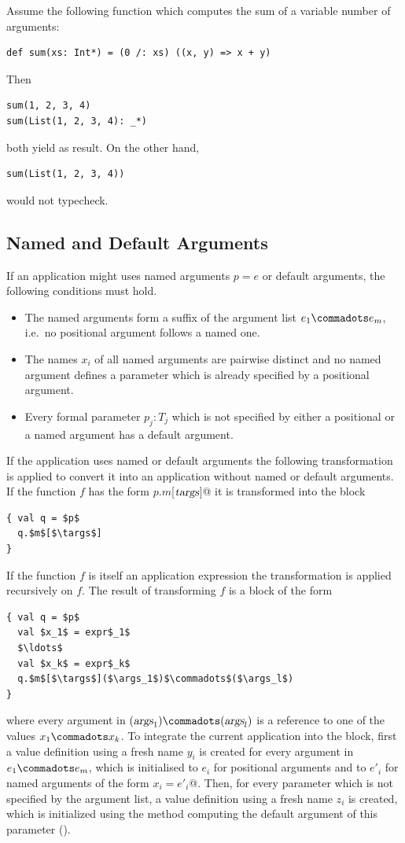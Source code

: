\example Assume the following function which computes the sum of a
variable number of arguments:
\begin{lstlisting}
def sum(xs: Int*) = (0 /: xs) ((x, y) => x + y)
\end{lstlisting}
Then
\begin{lstlisting}
sum(1, 2, 3, 4)
sum(List(1, 2, 3, 4): _*)
\end{lstlisting}
both yield  as result. On the other hand, 
\begin{lstlisting}
sum(List(1, 2, 3, 4))
\end{lstlisting}
would not typecheck.

\subsection{Named and Default Arguments}
\label{sec:named-default}

If an application might uses named arguments $p = e$ or default
arguments, the following conditions must hold.
\begin{itemize}
\item The named arguments form a suffix of the argument list $e_1 \commadots e_m$,
  i.e.\ no positional argument follows a named one.
\item The names $x_i$ of all named arguments are pairwise distinct and no named
  argument defines a parameter which is already specified by a
  positional argument.
\item Every formal parameter $p_j:T_j$ which is not specified by either a positional
  or a named argument has a default argument.
\end{itemize}

If the application uses named or default
arguments the following transformation is applied to convert it into
an application without named or default arguments. If the function $f$
has the form \lstinline@$p.m$[$\mbox{\sl targs}$]@ it is transformed into the
block
\begin{lstlisting}
{ val q = $p$
  q.$m$[$\targs$]
}
\end{lstlisting}
If the function $f$ is itself an application expression the transformation
is applied recursively on $f$. The result of transforming $f$ is a block of
the form
\begin{lstlisting}
{ val q = $p$
  val $x_1$ = expr$_1$
  $\ldots$
  val $x_k$ = expr$_k$
  q.$m$[$\targs$]($\args_1$)$\commadots$($\args_l$)
}
\end{lstlisting}
where every argument in $(\args_1) \commadots (\args_l)$ is a reference to
one of the values $x_1 \commadots x_k$. To integrate the current application
into the block, first a value definition using a fresh name $y_i$ is created
for every argument in $e_1 \commadots e_m$, which is initialised to $e_i$ for
positional arguments and to $e'_i$ for named arguments of the form
\lstinline@$x_i=e'_i$@. Then, for every parameter which is not specified
by the argument list, a value definition using a fresh name $z_i$ is created,
which is initialized using the method computing the default argument of
this parameter ().

